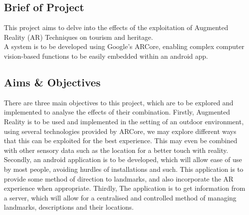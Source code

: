 \subsection{Brief of Project}
This project aims to delve into the effects of the exploitation of Augmented Reality (AR) Techniques on tourism and heritage.\\
A system is to be developed using Google's ARCore, enabling complex computer vision-based functions to be easily embedded within an android app. 
\subsection{Aims \& Objectives}
There are three main objectives to this project, which are to be explored and implemented to analyse the effects of their combination. 
Firstly, Augmented Reality is to be used and implemented in the setting of an outdoor environment, using several technologies provided by ARCore,
we may explore different ways that this can be exploited for the best experience. This may even be combined with other sensory data such 
as the location for a better touch with reality. Secondly, an android application is to be developed, which will allow ease of use by most people, avoiding hurdles of 
installations and such. This application is to provide some method of direction to landmarks, and also incorporate the AR experience when 
appropriate. Thirdly, The application is to get information from a server, which will allow for a centralised and controlled method of managing 
landmarks, descriptions and their locations.  

